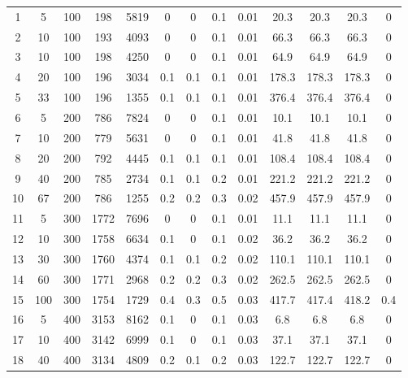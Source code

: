 \documentclass[11pt]{article}
\begin{document}
\begin{appendices}
\begin{landscape}
\begin{longtable}[c]{ccccc|cccc|cccc}
				\endhead
				\rowcolor[HTML]{EFEFEF} 
				1  & 5   & 100 & 198   & 5819  & 0   & 0   & 0.1 & 0.01 & 20.3  & 20.3  & 20.3  & 0    \\
				\rowcolor[HTML]{EFEFEF} 
				2  & 10  & 100 & 193   & 4093  & 0   & 0   & 0.1 & 0.01 & 66.3  & 66.3  & 66.3  & 0    \\
				\rowcolor[HTML]{EFEFEF} 
				3  & 10  & 100 & 198   & 4250  & 0   & 0   & 0.1 & 0.01 & 64.9  & 64.9  & 64.9  & 0    \\
				\rowcolor[HTML]{EFEFEF} 
				4  & 20  & 100 & 196   & 3034  & 0.1 & 0.1 & 0.1 & 0.01 & 178.3 & 178.3 & 178.3 & 0    \\
				\rowcolor[HTML]{EFEFEF} 
				5  & 33  & 100 & 196   & 1355  & 0.1 & 0.1 & 0.1 & 0.01 & 376.4 & 376.4 & 376.4 & 0    \\
				6  & 5   & 200 & 786   & 7824  & 0   & 0   & 0.1 & 0.01 & 10.1  & 10.1  & 10.1  & 0    \\
				7  & 10  & 200 & 779   & 5631  & 0   & 0   & 0.1 & 0.01 & 41.8  & 41.8  & 41.8  & 0    \\
				8  & 20  & 200 & 792   & 4445  & 0.1 & 0.1 & 0.1 & 0.01 & 108.4 & 108.4 & 108.4 & 0    \\
				9  & 40  & 200 & 785   & 2734  & 0.1 & 0.1 & 0.2 & 0.01 & 221.2 & 221.2 & 221.2 & 0    \\
				10 & 67  & 200 & 786   & 1255  & 0.2 & 0.2 & 0.3 & 0.02 & 457.9 & 457.9 & 457.9 & 0    \\
				\rowcolor[HTML]{EFEFEF} 
				11 & 5   & 300 & 1772  & 7696  & 0   & 0   & 0.1 & 0.01 & 11.1  & 11.1  & 11.1  & 0    \\
				\rowcolor[HTML]{EFEFEF} 
				12 & 10  & 300 & 1758  & 6634  & 0.1 & 0   & 0.1 & 0.02 & 36.2  & 36.2  & 36.2  & 0    \\
				\rowcolor[HTML]{EFEFEF} 
				13 & 30  & 300 & 1760  & 4374  & 0.1 & 0.1 & 0.2 & 0.02 & 110.1 & 110.1 & 110.1 & 0    \\
				\rowcolor[HTML]{EFEFEF} 
				14 & 60  & 300 & 1771  & 2968  & 0.2 & 0.2 & 0.3 & 0.02 & 262.5 & 262.5 & 262.5 & 0    \\
				\rowcolor[HTML]{EFEFEF} 
				15 & 100 & 300 & 1754  & 1729  & 0.4 & 0.3 & 0.5 & 0.03 & 417.7 & 417.4 & 418.2 & 0.4  \\
				16 & 5   & 400 & 3153  & 8162  & 0.1 & 0   & 0.1 & 0.03 & 6.8   & 6.8   & 6.8   & 0    \\
				17 & 10  & 400 & 3142  & 6999  & 0.1 & 0   & 0.1 & 0.03 & 37.1  & 37.1  & 37.1  & 0    \\
				18 & 40  & 400 & 3134  & 4809  & 0.2 & 0.1 & 0.2 & 0.03 & 122.7 & 122.7 & 122.7 & 0    \\

\end{longtable}
\end{landscape}
\end{appendices}
\end{document}
